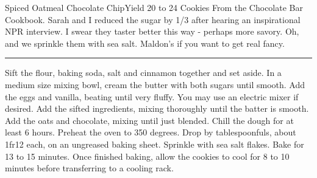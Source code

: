 \begin{recipe}{Spiced Oatmeal Chocolate Chip}{Yield 20 to 24 Cookies}{}
\freeform From the Chocolate Bar Cookbook. Sarah and I reduced the sugar by 1/3 after hearing an inspirational NPR interview. I swear they taster better this way - perhaps more savory. Oh, and we sprinkle them with sea salt. Maldon's if you want to get real fancy.\\
\rule{\textwidth}{0.05pt}

\freeform 
\newline Sift the flour, baking soda, salt and cinnamon together and set aside. In a medium size mixing bowl, cream the butter with both sugars until smooth. Add the eggs and vanilla, beating until very fluffy. You may use an electric mixer if desired. Add the sifted ingredients, mixing thoroughly until the batter is smooth. Add the oats and chocolate, mixing until just blended. Chill the dough for at least 6 hours.
\newline
\newline
Preheat the oven to 350 degrees.
\newline
\newline
Drop by tablespoonfuls, about 1fr12 each, on an ungreased baking sheet. Sprinkle with sea salt flakes. Bake for 13 to 15 minutes. Once finished baking, allow the cookies to cool for 8 to 10 minutes before transferring to a cooling rack.
\end {recipe}